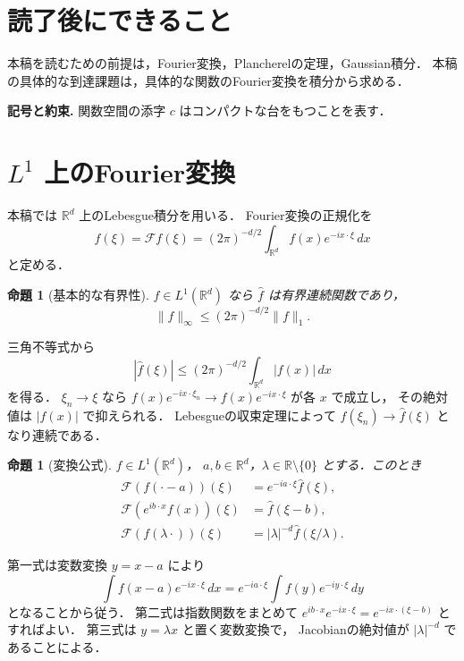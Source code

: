 \documentclass[a5paper,10pt,onecolumn]{jsarticle}
\makeatletter
\theoremstyle{mathnotetheorem}
\newtheorem{proposition}[theorem]{命題}
\renewcommand{\proofname}{証明}
\renewenvironment{proof}[1][\proofname]{%
  \par\pushQED{\qed}\normalfont\topsep4\p@\@plus2\p@\relax
  \trivlist\item[\hskip\labelsep\bfseries #1]\ignorespaces
}{\popQED\endtrivlist\@endpefalse}
\newcommand{\norm}[1]{\lVert #1\rVert}
\makeatother
\begin{document}
\section*{読了後にできること}
本稿を読むための前提は，Fourier変換，Plancherelの定理，Gaussian積分．
本稿の具体的な到達課題は，具体的な関数のFourier変換を積分から求める．


\par\noindent\textbf{記号と約束.}\quad
関数空間の添字 $c$ はコンパクトな台をもつことを表す．
\par

\section{$L^1$ 上のFourier変換}

本稿では $\mathbb R^d$ 上のLebesgue積分を用いる．
Fourier変換の正規化を
\[
 \widehat f(\xi)=\mathcal Ff(\xi)
 =(2\pi)^{-d/2}\int_{\mathbb R^d}
 f(x)e^{-ix\cdot\xi}\,dx
\]
と定める．

\begin{proposition}[基本的な有界性]\label{prop:l1-bounded}
$f\in L^1(\mathbb R^d)$ なら
$\widehat f$ は有界連続関数であり，
\[
 \norm{\widehat f}_\infty
 \le(2\pi)^{-d/2}\norm f_1.
\]
\end{proposition}
\begin{proof}
三角不等式から
\[
 |\widehat f(\xi)|
 \le(2\pi)^{-d/2}\int_{\mathbb R^d}|f(x)|\,dx
\]
を得る．
$\xi_n\to\xi$ なら
$f(x)e^{-ix\cdot\xi_n}\to f(x)e^{-ix\cdot\xi}$
が各 $x$ で成立し，
その絶対値は $|f(x)|$ で抑えられる．
Lebesgueの収束定理によって
$\widehat f(\xi_n)\to\widehat f(\xi)$ となり連続である．
\end{proof}

\begin{proposition}[変換公式]\label{prop:basic-transforms}
$f\in L^1(\mathbb R^d)$，
$a,b\in\mathbb R^d$，$\lambda\in\mathbb R\setminus\{0\}$
とする．このとき
\begin{align*}
 \mathcal F(f(\cdot-a))(\xi)&=e^{-ia\cdot\xi}\widehat f(\xi),\\
 \mathcal F(e^{ib\cdot x}f(x))(\xi)&=\widehat f(\xi-b),\\
 \mathcal F(f(\lambda\cdot))(\xi)
 &=|\lambda|^{-d}\widehat f(\xi/\lambda).
\end{align*}
\end{proposition}
\begin{proof}
第一式は変数変換 $y=x-a$ により
\[
 \int f(x-a)e^{-ix\cdot\xi}\,dx
 =e^{-ia\cdot\xi}\int f(y)e^{-iy\cdot\xi}\,dy
\]
となることから従う．
第二式は指数関数をまとめて
$e^{ib\cdot x}e^{-ix\cdot\xi}=e^{-ix\cdot(\xi-b)}$
とすればよい．
第三式は $y=\lambda x$ と置く変数変換で，
Jacobianの絶対値が $|\lambda|^{-d}$ であることによる．
\end{proof}
\end{document}
